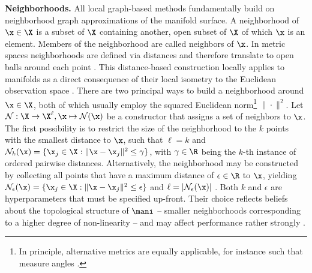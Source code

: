 \textbf{Neighborhoods.} All local graph-based methods fundamentally 
build on neighborhood graph approximations of the manifold surface.
A neighborhood of $\x \in \X$ is a subset of $\X$ containing another, open 
subset of $\X$ of which $\x$ is an element.
Members of the neighborhood are called neighbors of $\x$.
In metric spaces neighborhoods are defined via distances and therefore 
translate to open balls around each point \citep{waldmann2014}.
This distance-based construction locally applies to manifolds as a direct 
consequence of their local isometry to the Euclidean observation space 
\citep{mafu2011}.
There are two principal ways to build a neighborhood around $\x \in \X$, 
both of which usually employ the squared Euclidean norm\footnote{
In principle, alternative metrics are equally applicable, for instance such 
that measure angles \citep{belkinniyogi2004}.
} $\| \cdot \|^2$.
Let $\mathcal{N}: \X \rightarrow \X^{\ell}, \x \mapsto \mathcal{N} (\x)$ be a 
constructor that assigns a set of neighbors to $\x$.
The first possibility is to restrict the size of the neighborhood to the $k$ 
points with the smallest distance to $\x$, such that
$\ell = k$ and $\mathcal{N}_k(\x) = \{\x_j \in \X: 
\| \x - \x_j \|^2 \leq \gamma\}$, with $\gamma \in \R$ being the $k$-th instance 
of ordered pairwise distances.
Alternatively, the neighborhood may be constructed by collecting all points that
have a maximum distance of $\epsilon \in \R$ to $\x$, yielding 
$\mathcal{N}_{\epsilon} (\x) = 
\{\x_j \in \X: \| \x - \x_j \|^2 \leq \epsilon\}$ and 
$\ell = |\mathcal{N}_{\epsilon} (\x)|$ \citep{heetal2005}.
Both $k$ and $\epsilon$ are hyperparameters that must be specified up-front.
Their choice reflects beliefs about the topological structure of $\mani$ -- 
smaller neighborhoods corresponding to a higher degree of non-linearity -- and 
may affect performance rather strongly \citep{sudderth2002}.

